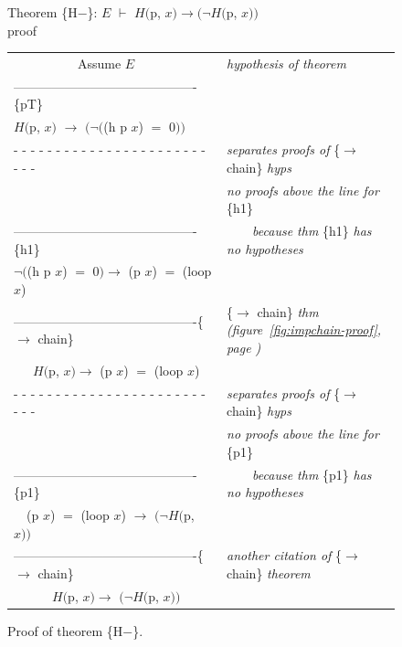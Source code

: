\begin{figure}
Theorem \{H$-$\}: $E$ $\vdash$ $H($p, $x) \rightarrow(\neg H($p, $x))$~\\
proof
\begin{center}
\begin{tabular}{ll}
~~~~~~~~~~Assume $E$                                &\emph{hypothesis of theorem}\\
-------------------------------------------\{pT\}   &\\
$H($\textsf{p}, $x)$ $\rightarrow$ $(\neg($\textsf{(h p $x$)} $=$ 0$))$   &\\
 - - - - - - - - - - - - - - - - - - - - - - - - - -&\emph{separates proofs of} \{$\rightarrow$ chain\} \emph{hyps}\\
                                                    &\emph{no proofs above the line for} \{h1\}\\
-------------------------------------------\{h1\}   &~~~~\emph{because thm} \{h1\} \emph{has no hypotheses}\\
$\neg($\textsf{(h p $x$)} $=$ \textsf{0}$) \rightarrow$ \textsf{(p $x$)} $=$ \textsf{(loop $x$)}&\\
-------------------------------------------\{$\rightarrow$ chain\} &\{$\rightarrow$ chain\} \emph{thm (figure~\ref{fig:impchain-proof}, page \pageref{fig:impchain-proof})}\\
~~~$H($\textsf{p}, $x) \rightarrow$ \textsf{(p $x$)} $=$ \textsf{(loop $x$)} &\\
 - - - - - - - - - - - - - - - - - - - - - - - - - -&\emph{separates proofs of} \{$\rightarrow$ chain\} \emph{hyps}\\
                                                    &\emph{no proofs above the line for} \{p1\}\\
-------------------------------------------\{p1\}   &~~~~\emph{because thm} \{p1\} \emph{has no hypotheses}\\
~~\textsf{(p $x$)} $=$ \textsf{(loop $x$)} $\rightarrow$ $(\neg H($\textsf{p}, $x))$ &\\
-------------------------------------------\{$\rightarrow$ chain\} &\emph{another citation of} \{$\rightarrow$ chain\} \emph{theorem}\\
~~~~~~$H($\textsf{p}, $x) \rightarrow$ $(\neg H($\textsf{p}, $x))$  &\\
\end{tabular}
\end{center}
\caption{Proof of theorem \{H$-$\}.}
\label{fig:hminus-thm-proof}
\end{figure}

